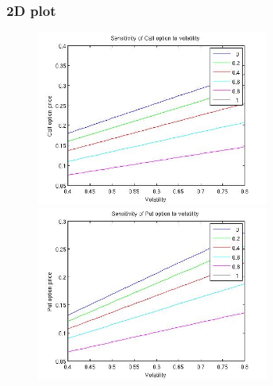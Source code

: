 \documentclass[12pt]{article}
\begin{document}
    \subsubsection*{2D plot}
    \begin{figure}[ht]
    \centering
      \begin{minipage}{.45\textwidth}
        \centering
        \includegraphics[width=3in]{call-vol.jpg}
      \end{minipage}
      \begin{minipage}{.45\textwidth}
        \centering
        \includegraphics[width=3in]{put-vol.jpg}
      \end{minipage}
    \end{figure}
\end{document}
